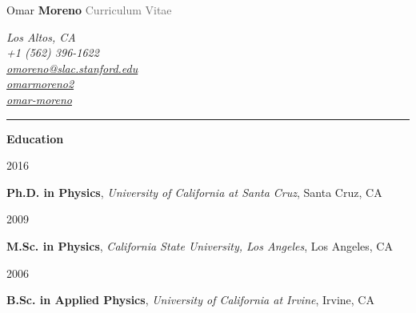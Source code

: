 \documentclass[11pt]{article}
\newcommand{\cvsection}[1] {
    \noindent
    \textcolor{indigodye}{\rule{.15\textwidth}{.1in} \hspace{0.01 \textwidth} \textbf{\Large{#1}}} \newline 
}
\newcommand{\educationentry}[5] { 
    \noindent
    \begin{minipage}[t]{0.15\textwidth} \begin{flushright} #1 \end{flushright} \end{minipage} \hspace{0.01\textwidth}
    \begin{minipage}[t]{0.84\textwidth} 
        \textbf{#2}, \emph{#3}, #4 
    \end{minipage}
}
\begin{document}
    
    \noindent
    \begin{minipage}[c]{0.5\textwidth}
        \begin{flushleft}
            \Huge{Omar \textcolor{indigodye}{\textbf{Moreno}}} \newline
            \Large{\textcolor{dimgray}{Curriculum Vitae}}
        \end{flushleft}
    \end{minipage}
    \begin{minipage}[c]{0.50\textwidth}
        \begin{flushright}
            \color{dimgray} \em
            Los Altos, CA           \\
            \faMobilePhone \hspace{1pt} +1 (562) 396-1622       \\
            \faEnvelope \hspace{1pt} \href{mailto:omoreno@slac.stanford.edu}{omoreno@slac.stanford.edu}          \\
            \faLinkedin \hspace{1pt} \href{https://www.linkedin.com/in/omarmoreno2}{omarmoreno2} \\
            \faGithub \hspace{1pt} \href{https://github.com/omar-moreno}{omar-moreno}            \\
        \end{flushright}
    \end{minipage}

    \cvsection{Education}
        \educationentry{2016}
                       {Ph.D. in Physics}
                       {University of California at Santa Cruz}
                       {Santa Cruz, CA}
                       {Dissertation: Search for a Heavy Photon in the 2015 Engineering Run Data of the Heavy Photon Search Experiment}
        \educationentry{2009}
                       {M.Sc. in Physics}
                       {California State University, Los Angeles}
                       {Los Angeles, CA}
                       {Thesis: Measurement of the Analyzing Power for the Reactions $p + CH_{2} \rightarrow X$ at a Proton Momentum of 2.2032 GeV/c}
        \educationentry{2006}
                       {B.Sc. in Applied Physics}
                       {University of California at Irvine}
                       {Irvine, CA}
                       {Thesis: Search for the $B\rightarrow e^+e^-$ as a Hint to Supersymmetry}
\end{document}

